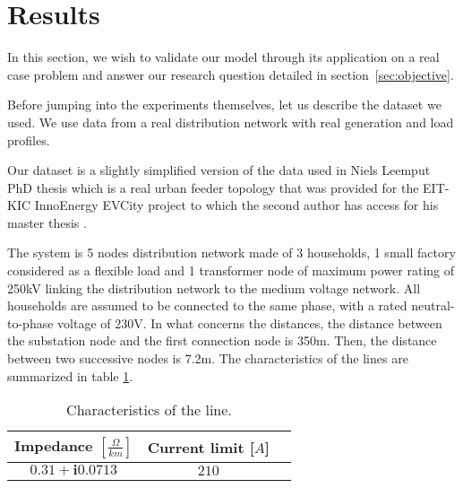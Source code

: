 \section{Results} %
\label{sec:results}

In this section, we wish to validate our model through its application on a real case problem and answer our research question detailed in section~\ref{sec:objective}.

Before jumping into the experiments themselves, let us describe the dataset we used.
We use data from a real distribution network with real generation and load profiles.

Our dataset is a slightly simplified version of the data used in Niels Leemput PhD thesis \cite{Niels} which is a real urban feeder topology that was provided for the EIT-KIC InnoEnergy EVCity project \cite{evcity} to which the second author has access for his master thesis \cite{Quentin}.

The system is 5 nodes distribution network made of 3 households, 1 small factory considered as a flexible load and 1 transformer node of maximum power rating of 250kV linking the distribution network to the medium voltage network.
All households are assumed to be connected to the same phase, with a rated neutral-to-phase voltage of 230V.
In what concerns the distances, the distance between the substation node and the first connection node is 350m.
Then, the distance between two successive nodes is 7.2m.
The characteristics of the lines are summarized in table \ref{tab:char_lines}.

\begin{table}
\centering
\begin{tabular}{ |c|c|c| }
\hline
 Impedance $\left[\frac{\Omega}{km}\right]$ & Current limit [$A$] \\
 \hline
 $0.31 + \mathbf{i}0.0713$ & $210$ \\
 \hline
\end{tabular}
\caption{Characteristics of the line.}
\label{tab:char_lines}
\end{table}

